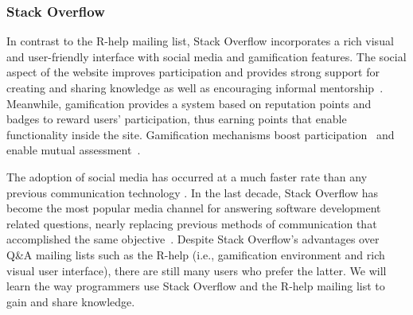 \subsubsection{Stack Overflow}
\label{subsec:Rtag}

    In contrast to the R-help mailing list, Stack Overflow incorporates a rich visual and user-friendly interface with social media and gamification features.
    The social aspect of the website improves participation and provides strong support for creating and sharing knowledge as well as encouraging informal mentorship~\cite{Jenkins2009, Storey2014}.
    Meanwhile, gamification provides a system based on reputation points and badges to reward users' participation, thus earning points that enable functionality inside the site.
    Gamification mechanisms boost participation~\cite{Vasilescu2014} and enable mutual assessment~\cite{Singer2013}.

    The adoption of social media has occurred at a much faster rate than any previous communication technology \cite{Chui2012}.
    In the last decade, Stack Overflow has become the most popular media channel for answering software development related questions, nearly replacing previous methods of communication that accomplished the same objective~\cite{Vasilescu2014c}.
    Despite Stack Overflow's advantages over Q\&A mailing lists such as the R-help (i.e., gamification environment and rich visual user interface), there are still many users who prefer the latter.
    We will learn the way programmers use Stack Overflow and the R-help mailing list to gain and share knowledge.

